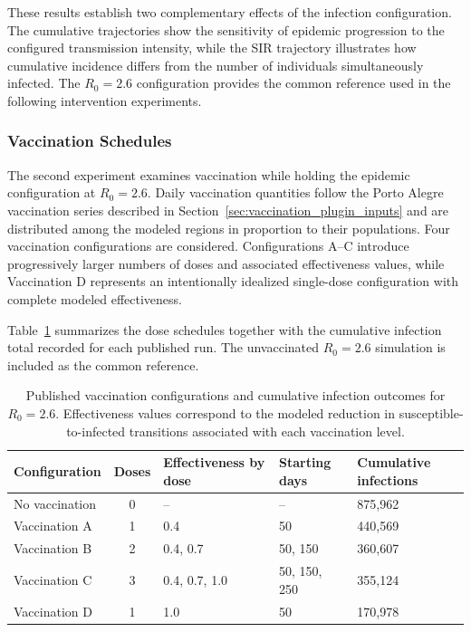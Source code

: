 These results establish two complementary effects of the infection configuration. The cumulative trajectories show the sensitivity of epidemic progression to the configured transmission intensity, while the SIR trajectory illustrates how cumulative incidence differs from the number of individuals simultaneously infected. The $R_0=2.6$ configuration provides the common reference used in the following intervention experiments.


\subsubsection{Vaccination Schedules}
\label{sec:results_epidemic_vaccination}

The second experiment examines vaccination while holding the epidemic configuration at $R_0=2.6$. Daily vaccination quantities follow the Porto Alegre vaccination series described in Section~\ref{sec:vaccination_plugin_inputs} and are distributed among the modeled regions in proportion to their populations. Four vaccination configurations are considered. Configurations A--C introduce progressively larger numbers of doses and associated effectiveness values, while Vaccination D represents an intentionally idealized single-dose configuration with complete modeled effectiveness.

Table~\ref{tbl:epidemic_vaccination_results} summarizes the dose schedules together with the cumulative infection total recorded for each published run. The unvaccinated $R_0=2.6$ simulation is included as the common reference.

\begin{table}[ht]
\centering
\setlength{\tabcolsep}{5pt}
\caption{Published vaccination configurations and cumulative infection outcomes for $R_0=2.6$. Effectiveness values correspond to the modeled reduction in susceptible-to-infected transitions associated with each vaccination level.}
\label{tbl:epidemic_vaccination_results}
\begin{tabularx}{\linewidth}{@{}lcp{3.2cm}p{2.4cm}X@{}}
\toprule
\textbf{Configuration} &
\textbf{Doses} &
\textbf{Effectiveness by dose} &
\textbf{Starting days} &
\textbf{Cumulative infections} \\
\midrule

No vaccination
& 0
& --
& --
& 875,962 \\

Vaccination A
& 1
& 0.4
& 50
& 440,569 \\

Vaccination B
& 2
& 0.4, 0.7
& 50, 150
& 360,607 \\

Vaccination C
& 3
& 0.4, 0.7, 1.0
& 50, 150, 250
& 355,124 \\

Vaccination D
& 1
& 1.0
& 50
& 170,978 \\

\bottomrule
\end{tabularx}
\end{table}

